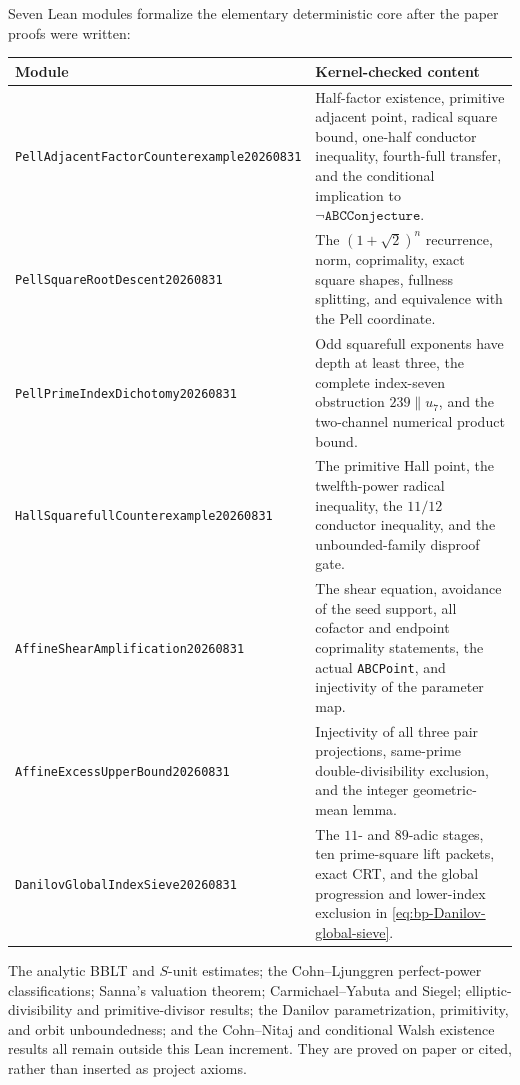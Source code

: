 Seven Lean modules formalize the elementary deterministic core after the
paper proofs were written:
\begin{center}
\begin{tabular}{>{\raggedright\arraybackslash}p{}
                >{\raggedright\arraybackslash}p{}}
\toprule
Module & Kernel-checked content\\
\midrule
\texttt{PellAdjacentFactor\allowbreak Counterexample20260831}
 & Half-factor existence, primitive adjacent point, radical square bound,
 one-half conductor inequality, fourth-full transfer, and the conditional
 implication to $\neg\texttt{ABCConjecture}$.\\
\texttt{PellSquareRoot\allowbreak Descent20260831}
 & The $(1+\sqrt2)^n$ recurrence, norm, coprimality, exact square shapes,
 fullness splitting, and equivalence with the Pell coordinate.\\
\texttt{PellPrimeIndex\allowbreak Dichotomy20260831}
 & Odd squarefull exponents have depth at least three, the complete
 index-seven obstruction $239\parallel u_7$, and the two-channel numerical
 product bound.\\
\texttt{HallSquarefull\allowbreak Counterexample20260831}
 & The primitive Hall point, the twelfth-power radical inequality, the
 $11/12$ conductor inequality, and the unbounded-family disproof gate.\\
\texttt{AffineShear\allowbreak Amplification20260831}
 & The shear equation, avoidance of the seed support, all cofactor and
 endpoint coprimality statements, the actual \texttt{ABCPoint}, and
 injectivity of the parameter map.\\
\texttt{AffineExcess\allowbreak UpperBound20260831}
 & Injectivity of all three pair projections, same-prime double-divisibility
 exclusion, and the integer geometric-mean lemma.\\
\texttt{DanilovGlobalIndex\allowbreak Sieve20260831}
 & The $11$- and $89$-adic stages, ten prime-square lift packets, exact CRT,
 and the global progression and lower-index exclusion in
 \eqref{eq:bp-Danilov-global-sieve}.\\
\bottomrule
\end{tabular}
\end{center}

The analytic BBLT and $S$-unit estimates; the Cohn--Ljunggren perfect-power
classifications; Sanna's valuation theorem; Carmichael--Yabuta and Siegel;
elliptic-divisibility and primitive-divisor results; the Danilov
parametrization, primitivity, and orbit unboundedness; and the Cohn--Nitaj and
conditional Walsh existence results all remain outside this Lean increment.
They are proved on paper or cited, rather than inserted as project axioms.


